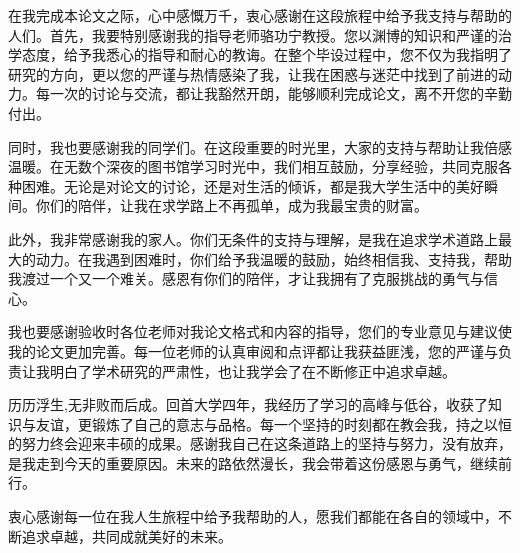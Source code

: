 \begin{acknowledgements}

在我完成本论文之际，心中感慨万千，衷心感谢在这段旅程中给予我支持与帮助的人们。首先，我要特别感谢我的指导老师骆功宁教授。您以渊博的知识和严谨的治学态度，给予我悉心的指导和耐心的教诲。在整个毕设过程中，您不仅为我指明了研究的方向，更以您的严谨与热情感染了我，让我在困惑与迷茫中找到了前进的动力。每一次的讨论与交流，都让我豁然开朗，能够顺利完成论文，离不开您的辛勤付出。

同时，我也要感谢我的同学们。在这段重要的时光里，大家的支持与帮助让我倍感温暖。在无数个深夜的图书馆学习时光中，我们相互鼓励，分享经验，共同克服各种困难。无论是对论文的讨论，还是对生活的倾诉，都是我大学生活中的美好瞬间。你们的陪伴，让我在求学路上不再孤单，成为我最宝贵的财富。

此外，我非常感谢我的家人。你们无条件的支持与理解，是我在追求学术道路上最大的动力。在我遇到困难时，你们给予我温暖的鼓励，始终相信我、支持我，帮助我渡过一个又一个难关。感恩有你们的陪伴，才让我拥有了克服挑战的勇气与信心。

我也要感谢验收时各位老师对我论文格式和内容的指导，您们的专业意见与建议使我的论文更加完善。每一位老师的认真审阅和点评都让我获益匪浅，您的严谨与负责让我明白了学术研究的严肃性，也让我学会了在不断修正中追求卓越。

历历浮生,无非败而后成。回首大学四年，我经历了学习的高峰与低谷，收获了知识与友谊，更锻炼了自己的意志与品格。每一个坚持的时刻都在教会我，持之以恒的努力终会迎来丰硕的成果。感谢我自己在这条道路上的坚持与努力，没有放弃，是我走到今天的重要原因。未来的路依然漫长，我会带着这份感恩与勇气，继续前行。

衷心感谢每一位在我人生旅程中给予我帮助的人，愿我们都能在各自的领域中，不断追求卓越，共同成就美好的未来。


\end{acknowledgements}
